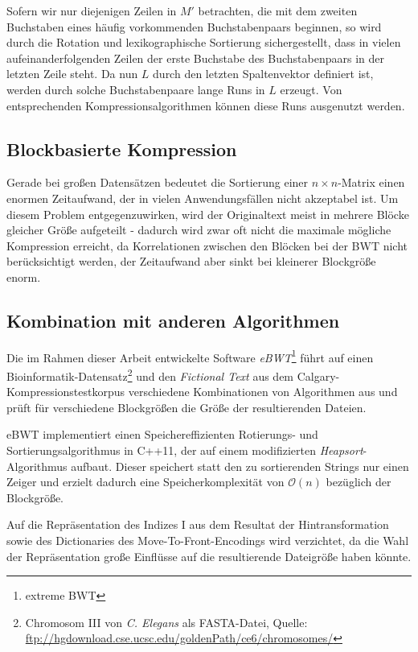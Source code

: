 \documentclass[ngerman,pdftex,paper=A4,DIV=calc,titlepage,12pt]{scrartcl}
\newtheorem[L]{boxedDefinition}{Definition}
\begin{document}
Sofern wir nur diejenigen Zeilen in $M'$ betrachten, die mit dem zweiten Buchstaben eines häufig vorkommenden Buchstabenpaars beginnen, so wird durch die Rotation und lexikographische Sortierung sichergestellt, dass    in vielen aufeinanderfolgenden Zeilen der erste Buchstabe des Buchstabenpaars in der letzten Zeile steht. Da nun $L$ durch den letzten Spaltenvektor definiert ist, werden durch solche Buchstabenpaare lange Runs in $L$ erzeugt. Von entsprechenden Kompressionsalgorithmen können diese Runs ausgenutzt werden.

\subsection{Blockbasierte Kompression}
Gerade bei großen Datensätzen bedeutet die Sortierung einer $n \times n$-Matrix einen enormen Zeitaufwand, der in vielen Anwendungsfällen nicht akzeptabel ist. Um diesem Problem entgegenzuwirken, wird der Originaltext meist in mehrere Blöcke gleicher Größe aufgeteilt - dadurch wird zwar oft nicht die maximale mögliche Kompression erreicht, da Korrelationen zwischen den Blöcken bei der BWT nicht berücksichtigt werden, der Zeitaufwand aber sinkt bei kleinerer Blockgröße enorm.

\subsection{Kombination mit anderen Algorithmen}\label{ssec:ebwt}
Die im Rahmen dieser Arbeit entwickelte Software \textit{eBWT}\footnote{extreme BWT} führt auf einen Bioinformatik-Datensatz\footnote{Chromosom III von \textit{C. Elegans} als FASTA-Datei, Quelle: \url{ftp://hgdownload.cse.ucsc.edu/goldenPath/ce6/chromosomes/}} und den \textit{Fictional Text} aus dem Calgary-Kompressionstestkorpus verschiedene Kombinationen von Algorithmen aus und prüft für verschiedene Blockgrößen die Größe der resultierenden Dateien.

eBWT implementiert einen Speichereffizienten Rotierungs- und Sortierungsalgorithmus in C++11, der auf einem modifizierten \textit{Heapsort}-Algorithmus aufbaut. Dieser speichert statt den zu sortierenden Strings nur einen Zeiger und erzielt dadurch eine Speicherkomplexität von $\mathcal{O}(n)$ bezüglich der Blockgröße.

Auf die Repräsentation des Indizes I aus dem Resultat der Hintransformation sowie des Dictionaries des Move-To-Front-Encodings wird verzichtet, da die Wahl der Repräsentation große Einflüsse auf die resultierende Dateigröße haben könnte.
\end{document}

